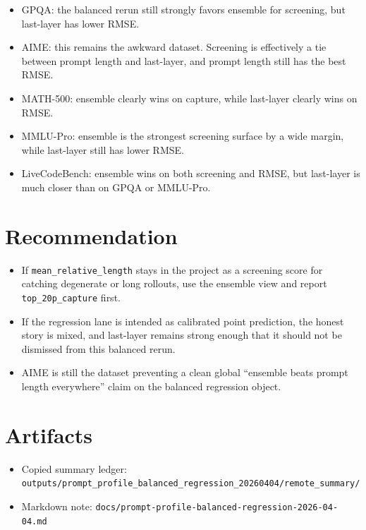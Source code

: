 \documentclass[11pt]{article}
\begin{document}
\begin{itemize}
\item GPQA: the balanced rerun still strongly favors ensemble for screening, but last-layer has lower RMSE.
\item AIME: this remains the awkward dataset. Screening is effectively a tie between prompt length and last-layer, and prompt length still has the best RMSE.
\item MATH-500: ensemble clearly wins on capture, while last-layer clearly wins on RMSE.
\item MMLU-Pro: ensemble is the strongest screening surface by a wide margin, while last-layer still has lower RMSE.
\item LiveCodeBench: ensemble wins on both screening and RMSE, but last-layer is much closer than on GPQA or MMLU-Pro.
\end{itemize}

\section{Recommendation}

\begin{itemize}
\item If \texttt{mean\_relative\_length} stays in the project as a screening score for catching degenerate or long rollouts, use the ensemble view and report \texttt{top\_20p\_capture} first.
\item If the regression lane is intended as calibrated point prediction, the honest story is mixed, and last-layer remains strong enough that it should not be dismissed from this balanced rerun.
\item AIME is still the dataset preventing a clean global ``ensemble beats prompt length everywhere'' claim on the balanced regression object.
\end{itemize}

\section{Artifacts}

\begin{itemize}
\item Copied summary ledger: \texttt{outputs/prompt\_profile\_balanced\_regression\_20260404/remote\_summary/}
\item Markdown note: \texttt{docs/prompt-profile-balanced-regression-2026-04-04.md}
\end{itemize}
\end{document}
